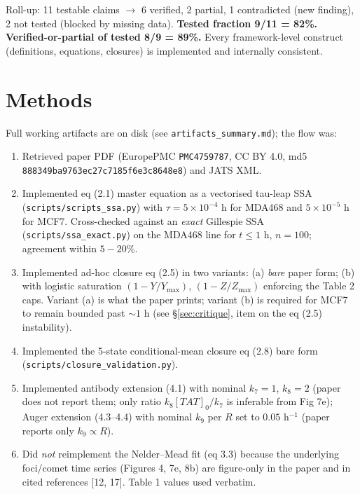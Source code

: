 \documentclass[11pt]{article}
\begin{document}
\noindent Roll-up: 11 testable claims $\rightarrow$ 6 verified, 2 partial, 1 contradicted (new
finding), 2 not tested (blocked by missing data). \textbf{Tested fraction 9/11 = 82\%.
Verified-or-partial of tested 8/9 = 89\%.} Every framework-level construct (definitions,
equations, closures) is implemented and internally consistent.

\section{Methods}

Full working artifacts are on disk (see \texttt{artifacts\_summary.md}); the flow was:

\begin{enumerate}
    \item Retrieved paper PDF (EuropePMC \texttt{PMC4759787}, CC BY 4.0, md5
      \texttt{888349ba9763ec27c7185f6e3c8648e8}) and JATS XML.
    \item Implemented eq (2.1) master equation as a vectorised tau-leap SSA
      (\texttt{scripts/scripts\_ssa.py}) with $\tau = 5\!\times\!10^{-4}$ h for MDA468 and
      $5\!\times\!10^{-5}$ h for MCF7. Cross-checked against an \emph{exact} Gillespie SSA
      (\texttt{scripts/ssa\_exact.py}) on the MDA468 line for $t\le 1$ h, $n{=}100$; agreement
      within $5\!-\!20$\%.
    \item Implemented ad-hoc closure eq (2.5) in two variants: (a) \emph{bare} paper form; (b)
      with logistic saturation $(1-Y/Y_{\max})$, $(1-Z/Z_{\max})$ enforcing the Table 2 caps.
      Variant (a) is what the paper prints; variant (b) is required for MCF7 to remain bounded
      past $\sim 1$ h (see \S\ref{sec:critique}, item on the eq (2.5) instability).
    \item Implemented the 5-state conditional-mean closure eq (2.8) bare form
      (\texttt{scripts/closure\_validation.py}).
    \item Implemented antibody extension (4.1) with nominal $k_7{=}1$, $k_8{=}2$ (paper does
      not report them; only ratio $k_8[TAT]_0/k_7$ is inferable from Fig 7e); Auger extension
      (4.3--4.4) with nominal $k_9$ per $R$ set to $0.05$ h$^{-1}$ (paper reports only
      $k_9 \propto R$).
    \item Did \emph{not} reimplement the Nelder--Mead fit (eq 3.3) because the underlying
      foci/comet time series (Figures 4, 7e, 8b) are figure-only in the paper and in cited
      references [12, 17]. Table 1 values used verbatim.
\end{enumerate}
\end{document}
